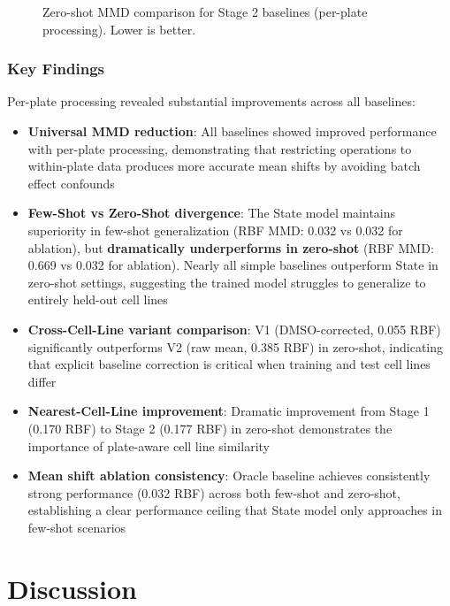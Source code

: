 \documentclass[conference]{IEEEtran}
\begin{document}
\begin{figure}[h]
\centering
\caption{Zero-shot MMD comparison for Stage 2 baselines (per-plate processing). Lower is better.}
\label{fig:zeroshot-stage2}
\end{figure}

\subsubsection{Key Findings}

Per-plate processing revealed substantial improvements across all baselines:

\begin{itemize}
    \item \textbf{Universal MMD reduction}: All baselines showed improved performance with per-plate processing, demonstrating that restricting operations to within-plate data produces more accurate mean shifts by avoiding batch effect confounds

    \item \textbf{Few-Shot vs Zero-Shot divergence}: The State model maintains superiority in few-shot generalization (RBF MMD: 0.032 vs 0.032 for ablation), but \textbf{dramatically underperforms in zero-shot} (RBF MMD: 0.669 vs 0.032 for ablation). Nearly all simple baselines outperform State in zero-shot settings, suggesting the trained model struggles to generalize to entirely held-out cell lines

    \item \textbf{Cross-Cell-Line variant comparison}: V1 (DMSO-corrected, 0.055 RBF) significantly outperforms V2 (raw mean, 0.385 RBF) in zero-shot, indicating that explicit baseline correction is critical when training and test cell lines differ

    \item \textbf{Nearest-Cell-Line improvement}: Dramatic improvement from Stage 1 (0.170 RBF) to Stage 2 (0.177 RBF) in zero-shot demonstrates the importance of plate-aware cell line similarity

    \item \textbf{Mean shift ablation consistency}: Oracle baseline achieves consistently strong performance (0.032 RBF) across both few-shot and zero-shot, establishing a clear performance ceiling that State model only approaches in few-shot scenarios
\end{itemize}

\section{Discussion}
\end{document}
